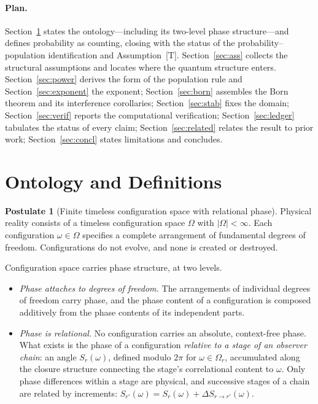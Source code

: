 \documentclass[11pt]{article}
\theoremstyle{definition}
\newtheorem{postulate}{Postulate}
\theoremstyle{remark}
\begin{document}
\paragraph{Plan.}
Section~\ref{sec:defs} states the ontology---including its two-level phase structure---and defines probability as counting, closing with the status of the probability--population identification and Assumption~[T]. Section~\ref{sec:ass} collects the structural assumptions and locates where the quantum structure enters. Section~\ref{sec:power} derives the form of the population rule and Section~\ref{sec:exponent} the exponent; Section~\ref{sec:born} assembles the Born theorem and its interference corollaries; Section~\ref{sec:stab} fixes the domain; Section~\ref{sec:verif} reports the computational verification; Section~\ref{sec:ledger} tabulates the status of every claim; Section~\ref{sec:related} relates the result to prior work; Section~\ref{sec:concl} states limitations and concludes.

\section{Ontology and Definitions}\label{sec:defs}

\begin{postulate}[Finite timeless configuration space with relational phase]\label{post:omega}
Physical reality consists of a timeless configuration space $\Omega$ with $|\Omega| < \infty$. Each configuration $\omega \in \Omega$ specifies a complete arrangement of fundamental degrees of freedom. Configurations do not evolve, and none is created or destroyed.

Configuration space carries phase structure, at two levels.
\begin{itemize}
\item \emph{Phase attaches to degrees of freedom.} The arrangements of individual degrees of freedom carry phase, and the phase content of a configuration is composed additively from the phase contents of its independent parts.
\item \emph{Phase is relational.} No configuration carries an absolute, context-free phase. What exists is the phase of a configuration \emph{relative to a stage of an observer chain}: an angle $S_r(\omega)$, defined modulo $2\pi$ for $\omega \in \Omega_r$, accumulated along the closure structure connecting the stage's correlational content to $\omega$. Only phase differences within a stage are physical, and successive stages of a chain are related by increments: $S_{r'}(\omega) = S_r(\omega) + \Delta S_{r \to r'}(\omega)$.
\end{itemize}
\end{postulate}
\end{document}
